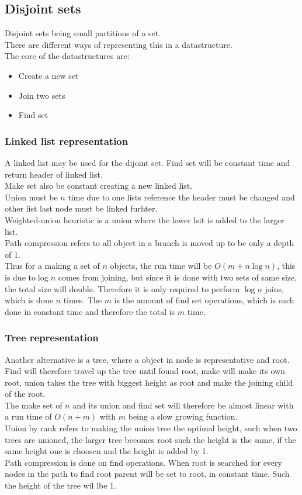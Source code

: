 \documentclass[12pt, a4paper]{article}
\begin{document}
						\subsection{Disjoint sets}
			Disjoint sets being small partitions of a set.\\
			There are different ways of representing this in a datastructure.\\
			The core of the datastructures are:
			\begin{itemize}
				\item Create a new set
				\item Join two sets
				\item Find set
			\end{itemize}
			\subsubsection{Linked list representation}
				A linked list may be used for the dijoint set. Find set will be constant time and return header of linked list.\\
				Make set also be constant creating a new linked list.\\
				Union must be $n$ time due to one lists reference the header must be changed and other list last node must be linked furhter.\\
				Weighted-union heuristic is a union where the lower lsit is added to the larger list.\\
				Path compression refers to all object in a branch is moved up to be only a depth of 1.\\
				Thus for a making a set of $n$ objects, the run time will be $O(m+n\log n)$, this is due to$\log n$ comes from joining, but since it is done with two sets of same size, the total size will double. Therefore it is only required to perform $\log n$ joins, which is done $n$ times. The $m$ is the amount of find set operations, which is each done in constant time and therefore the total is $m$ time.\\[4mm]
			\subsubsection{Tree representation}
				Another alternative is a tree, where a object in node is representative and root. Find will therefore travel up the tree until found root, make will make its own root, union takes the tree with biggest height as root and make the joining child of the root.\\
				The make set of $n$ and its union and find set will therefore be almost linear with a run time of $O(n+m)$ with $m$ being a slow growing function.\\
				Union by rank refers to making the union tree the optimal height, such when two trees are unioned, the larger tree becomes root such the height is the same, if the same height one is choosen and the height is added by 1.\\
				Path compression is done on find operations. When root is searched for every nodes in the path to find root parent will be set to root, in constant time. Such the height of the tree wil lbe 1.
\end{document}
